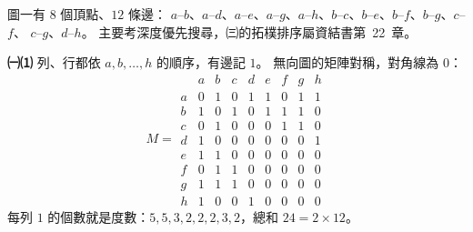\begin{pastsoln}
圖一有 $8$ 個頂點、$12$ 條邊：
$a$--$b$、$a$--$d$、$a$--$e$、$a$--$g$、$a$--$h$、$b$--$c$、$b$--$e$、$b$--$f$、$b$--$g$、$c$--$f$、
$c$--$g$、$d$--$h$。 主要考深度優先搜尋，㈢的拓樸排序屬資結書第~22~章。

\textbf{㈠⑴} 列、行都依 $a, b, \ldots, h$ 的順序，有邊記 $1$。 無向圖的矩陣對稱，對角線為 $0$：
\[
M = \begin{array}{c|cccccccc}
 & a & b & c & d & e & f & g & h \\ \hline
a & 0 & 1 & 0 & 1 & 1 & 0 & 1 & 1 \\
b & 1 & 0 & 1 & 0 & 1 & 1 & 1 & 0 \\
c & 0 & 1 & 0 & 0 & 0 & 1 & 1 & 0 \\
d & 1 & 0 & 0 & 0 & 0 & 0 & 0 & 1 \\
e & 1 & 1 & 0 & 0 & 0 & 0 & 0 & 0 \\
f & 0 & 1 & 1 & 0 & 0 & 0 & 0 & 0 \\
g & 1 & 1 & 1 & 0 & 0 & 0 & 0 & 0 \\
h & 1 & 0 & 0 & 1 & 0 & 0 & 0 & 0
\end{array}
\]
每列 $1$ 的個數就是度數：$5, 5, 3, 2, 2, 2, 3, 2$，總和 $24 = 2 \times 12$。


\end{pastsoln}
